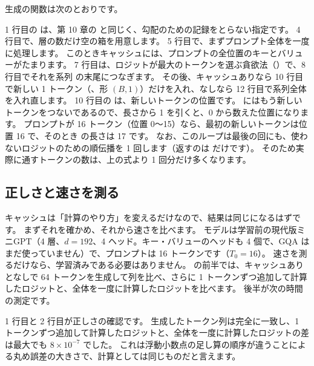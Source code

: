 生成の関数は次のとおりです。


1 行目の  は、第 10 章の  と同じく、勾配のための記録をとらない指定です。
4 行目で、層の数だけ空の箱を用意します。
5 行目で、まずプロンプト全体を一度に処理します。
このときキャッシュには、プロンプトの全位置のキーとバリューがたまります。
7 行目は、ロジットが最大のトークンを選ぶ貪欲法（）で、8 行目でそれを系列  の末尾につなぎます。
その後、キャッシュありなら 10 行目で新しい 1 トークン（、形 $(B,1)$）だけを入れ、なしなら 12 行目で系列全体を入れ直します。
10 行目の  は、新しいトークンの位置です。
 にはもう新しいトークンをつないであるので、長さから 1 を引くと、0 から数えた位置になります。
プロンプトが 16 トークン（位置 0〜15）なら、最初の新しいトークンは位置 16 で、そのとき  の長さは 17 です。
なお、このループは最後の回にも、使わないロジットのための順伝播を 1 回します（返すのは  だけです）。
そのため実際に通すトークンの数は、上の式より 1 回分だけ多くなります。

\subsection*{正しさと速さを測る}

キャッシュは「計算のやり方」を変えるだけなので、結果は同じになるはずです。
まずそれを確かめ、それから速さを比べます。
モデルは学習前の現代版ミニGPT（4 層、$d=192$、4 ヘッド。キー・バリューのヘッドも 4 個で、GQA はまだ使っていません）で、プロンプトは 16 トークンです（$T_0=16$）。
速さを測るだけなら、学習済みである必要はありません。
 の前半では、キャッシュありとなしで 64 トークンを生成して列を比べ、さらに 1 トークンずつ追加して計算したロジットと、全体を一度に計算したロジットを比べます。
後半が次の時間の測定です。


1 行目と 2 行目が正しさの確認です。
生成したトークン列は完全に一致し、1 トークンずつ追加して計算したロジットと、全体を一度に計算したロジットの差は最大でも $8\times10^{-7}$ でした。
これは浮動小数点の足し算の順序が違うことによる丸め誤差の大きさで、計算としては同じものだと言えます。

